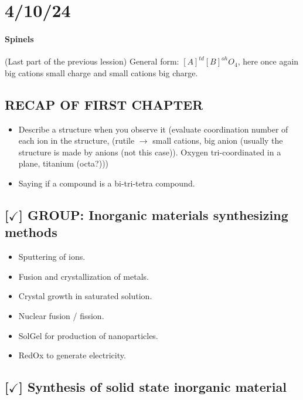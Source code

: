 \section{4/10/24}

\paragraph{Spinels}

(Last part of the previous lession) General form: $[A]^{td}[B]^{oh}O_4$, here once again big cations small charge and small cations big charge.

\subsection{RECAP OF FIRST CHAPTER}

\begin{itemize}
    \item Describe a structure when you observe it (evaluate coordination number of each ion in the structure, (rutile $\rightarrow$ small cations, big anion (usually the structure is made by anions (not this case)). Oxygen tri-coordinated in a plane, titanium (octa?)))
    \item Saying if a compound is a bi-tri-tetra compound.
\end{itemize}

\subsection{[$\checkmark$] GROUP: Inorganic materials synthesizing methods}

\begin{itemize}
    \item Sputtering of ions.
    \item Fusion and crystallization of metals.
    \item Crystal growth in saturated solution.
    \item Nuclear fusion / fission.
    \item SolGel for production of nanoparticles.
    \item RedOx to generate electricity.
\end{itemize}

\subsection{[$\checkmark$] Synthesis of solid state inorganic material}

